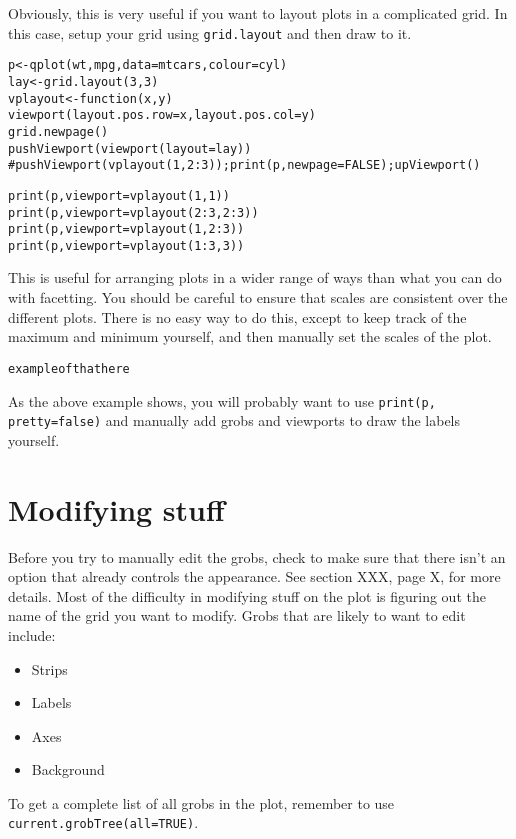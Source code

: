 Obviously, this is very useful if you want to layout plots in a complicated grid.  In this case, setup your grid using {\tt grid.layout} and then draw to it.

\begin{alltt}
p <- qplot(wt, mpg, data=mtcars, colour=cyl)
lay <- grid.layout(3,3)
vplayout <- function(x, y) 
  viewport(layout.pos.row=x, layout.pos.col=y)
grid.newpage()
pushViewport(viewport(layout=lay))
#pushViewport(vplayout(1,2:3)); print(p, newpage=FALSE); upViewport()

print(p, viewport=vplayout(1,1))
print(p, viewport=vplayout(2:3,2:3))
print(p, viewport=vplayout(1, 2:3))
print(p, viewport=vplayout(1:3, 3))
\end{alltt}

This is useful for arranging plots in a wider range of ways than what you can do with facetting.   You should be careful to ensure that scales are consistent over the different plots.  There is no easy way to do this, except to keep track of the maximum and minimum yourself, and then manually set the scales of the plot.

\begin{alltt}
	example of that here
\end{alltt}

As the above example shows, you will probably want to use {\tt print(p, pretty=false)} and manually add grobs and viewports to draw the labels yourself.
 
\section{Modifying stuff}\label{sec:modifying_stuff}

Before you try to manually edit the grobs, check to make sure that there isn't an option that already controls the appearance.  See section XXX, page X, for more details.  Most of the difficulty in modifying stuff on the plot is figuring out the name of the grid you want to modify.  Grobs that are likely to want to edit include:

\begin{itemize}
	\item Strips
	\item Labels
	\item Axes
	\item Background
\end{itemize}

To get a complete list of all grobs in the plot, remember to use {\tt current.grobTree(all=TRUE)}.  

